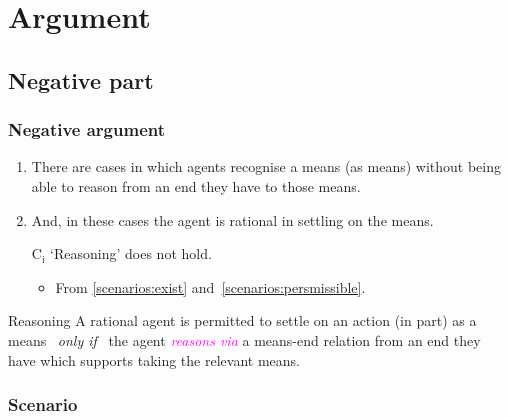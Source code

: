 \documentclass[noamssymb,
]{beamer} %
\newcommand{\hozlinedash}[0]{%
  \noindent\hdashrule[0.5ex][c]{\textwidth}{.1pt}{2.5pt}
}
\begin{document}
\section{Argument}
\label{sec:argument}


\subsection{Negative part}
\label{sec:negative}

\begin{frame}
  \frametitle{Negative argument}

  \begin{enumerate}
  \item\label{scenarios:exist} There are cases in which agents recognise a means (as means) without being able to reason from an end they have to those means.
  \item\label{scenarios:persmissible} And, in these cases the agent is rational in settling on the means.

  \item[C\(_{\text{i}}\)] `Reasoning' does not hold.
    \begin{itemize}
    \item From \ref{scenarios:exist} and~\ref{scenarios:persmissible}.
    \end{itemize}
  \end{enumerate}

  \hozlinedash
  {\footnotesize
    \begin{block}{Reasoning}
      A rational agent is permitted to settle on an action (in part) as a means
      \newline
      \mbox{ }\hfill\emph{only if}\hfill\mbox{ }
      \newline
      the agent \textcolor{fuchsia}{\emph{reasons via}}  a means-end relation from an end they have which supports taking the relevant means.
    \end{block}
  }
\end{frame}

\subsubsection{Scenario}
\label{sec:case}
\end{document}

